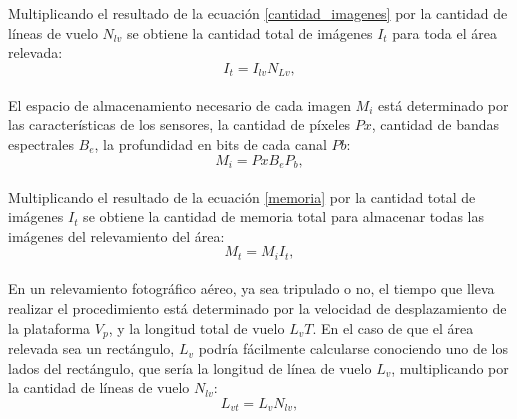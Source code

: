 Multiplicando el resultado de la ecuación \ref{cantidad_imagenes} por la cantidad de líneas de vuelo $N_{lv}$ se obtiene la cantidad total de imágenes $I_t$ para toda el área relevada:
\\
\begin{equation}
	I_t={I_{lv}}{N_{Lv}},\label{cantidad_total_imagenes}
\end{equation}
\\
El espacio de almacenamiento necesario de cada imagen $M_i$ está determinado por las características de los sensores, la cantidad de píxeles $Px$, cantidad de bandas espectrales $B_e$, la profundidad en bits de cada canal $Pb$:
\\
\begin{equation}
	M_i={Px}{B_e}{P_b},\label{memoria}
\end{equation}
\\
Multiplicando el resultado de la ecuación \ref{memoria} por la cantidad total de imágenes $I_t$ se obtiene la cantidad de memoria total para almacenar todas las imágenes del relevamiento del área:
\\
\begin{equation}
	M_t={M_i}{I_t},\label{memoria_total}
\end{equation}
\\
En un relevamiento fotográfico aéreo, ya sea tripulado o no, el tiempo que lleva realizar el procedimiento está determinado por la velocidad de desplazamiento de la plataforma $V_p$, y la longitud total de vuelo $L_vT$. 
En el caso de que el área relevada sea un rectángulo, $L_v$ podría fácilmente calcularse conociendo uno de los lados del rectángulo, que sería la longitud de línea de vuelo $L_v$, multiplicando por la cantidad de líneas de vuelo $N_{lv}$:
\\
\begin{equation}
	L_{vt}={L_v}{N_{lv}},\label{longitud_total}
\end{equation}
